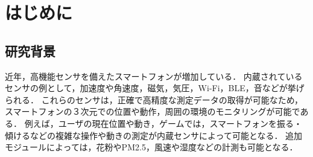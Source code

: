 \chapter{はじめに}
\thispagestyle{myheadings}


\section{研究背景}
\label{sec:schedule}

近年，高機能センサを備えたスマートフォンが増加している．
内蔵されているセンサの例として，加速度や角速度，磁気，気圧，Wi-Fi，BLE，音などが挙げられる．
これらのセンサは，正確で高精度な測定データの取得が可能なため，スマートフォンの３次元での位置や動作，周囲の環境のモニタリングが可能である．
例えば，ユーザの現在位置や動き，ゲームでは，スマートフォンを振る・傾けるなどの複雑な操作や動きの測定が内蔵センサによって可能となる．
追加モジュールによっては，花粉やPM2.5，風速や湿度などの計測も可能となる．

